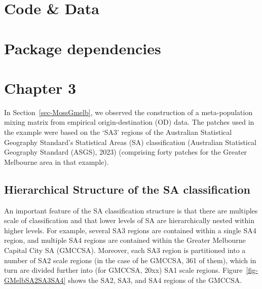 \documentclass[
  letterpaper,
  DIV=11,
  numbers=noendperiod]{scrreprt}
\begin{document}
\hypertarget{code-data}{%
\chapter{Code \& Data}\label{code-data}}

\hypertarget{package-dependencies}{%
\chapter{Package dependencies}\label{package-dependencies}}

\hypertarget{chapter-3}{%
\chapter{Chapter 3}\label{chapter-3}}

In Section~\ref{sec-MossGmelb}, we observed the construction of a
meta-population mixing matrix from empirical origin-destination (OD)
data. The patches used in the example were based on the `SA3' regions of
the Australian Statistical Geography Standard's Statistical Areas (SA)
classification (Australian Statistical Geography Standard (ASGS), 2023)
(comprising forty patches for the Greater Melbourne area in that
example).

\hypertarget{hierarchical-structure-of-the-sa-classification}{%
\section{Hierarchical Structure of the SA
classification}\label{hierarchical-structure-of-the-sa-classification}}

An important feature of the SA classification structure is that there
are multiples scale of classification and that lower levels of SA are
hierarchically nested within higher levels. For example, several SA3
regions are contained within a single SA4 region, and multiple SA4
regions are contained within the Greater Melbourne Capital City SA
(GMCCSA). Moreover, each SA3 region is partitioned into a number of SA2
scale regions (in the case of he GMCCSA, 361 of them), which in turn are
divided further into (for GMCCSA, 20xx) SA1 scale regions.
Figure~\ref{fig-GMelbSA2SA3SA4} shows the SA2, SA3, and SA4 regions of
the GMCCSA.
\end{document}
